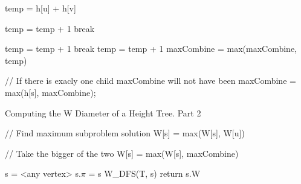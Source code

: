 \begin{algorithm}[h]{}
\begin{algorithmic}[1]
            \State temp = h[u] + h[v]

                        \State temp = temp + 1
                        \State break
                    \EndIf
                \EndFor
            \EndIf

                        \State temp = temp + 1
                        \State break
                    \EndIf
                \EndFor
            \EndIf
                \State temp = temp + 1
            \EndIf
            \State maxCombine = max(maxCombine, temp)
        \EndFor

    // If there is exacly one child maxCombine will not have been
    \State maxCombine = max(h[s], maxCombine);

    \EndFor

\end{algorithmic}
\end{algorithm}

\begin{algorithm}{}
\caption{Computing the W Diameter of a Height Tree. Part 2}
\begin{algorithmic}[1]

    \State // Find maximum subproblem solution
        \State W[s] = max(W[s], W[u])
    \EndFor

    \State // Take the bigger of the two
    \State W[s] = max(W[s], maxCombine)


    \State s = <any vertex>
    \State s.$\pi$ = s
    \State W\_DFS(T, s)
    \State return s.W
\EndFunction

\end{algorithmic}
\end{algorithm}






